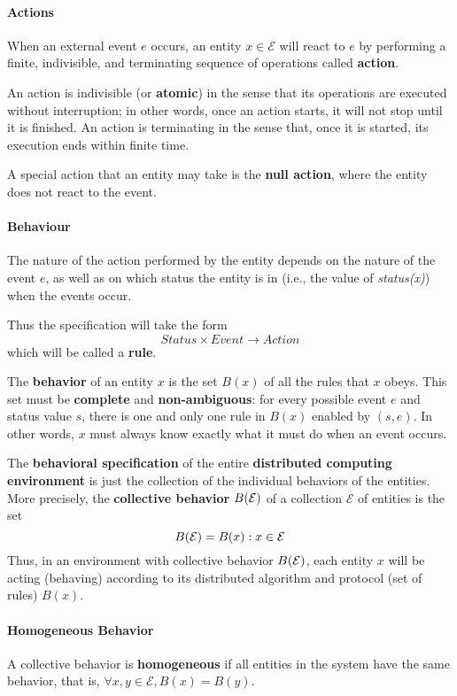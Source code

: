 \paragraph{Actions} When an external event $e$ occurs, an entity $x \in \mathcal{E}$ will react to $e$ by performing a finite, indivisible, and terminating sequence of operations called \textbf{action}.

An action is indivisible (or \textbf{atomic}) in the sense that its operations are executed without interruption; in other words, once an action starts, it will not stop until it is finished. An action is terminating in the sense that, once it is started, its execution ends within finite time. 

A special action that an entity may take is the \textbf{null action}, where the entity does not react to the event.

\paragraph{Behaviour} The nature of the action performed by the entity depends on the nature of the event $e$, as well as on which status the entity is in (i.e., the value of \textit{status(x)}) when the events occur. 

Thus the specification will take the form
$$ Status \times Event \xrightarrow{} Action$$
which will be called a \textbf{rule}.

The \textbf{behavior} of an entity $x$ is the set $B(x)$ of all the rules that $x$ obeys. This set must be \textbf{complete} and \textbf{non-ambiguous}: for every possible event $e$ and status value $s$, there is one and only one rule in $B(x)$ enabled by $(s,e)$. In other words, $x$ must always know exactly what it must do when an event occurs. 

The \textbf{behavioral specification} of the entire \textbf{distributed computing environment} is just the collection of the individual behaviors of the entities. More precisely, the \textbf{collective behavior} $B(\mathcal{E})$ of a collection $\mathcal{E}$ of entities is the set
$$B(\mathcal{E}) ={B(x): x \in \mathcal{E}}$$
Thus, in an environment with collective behavior $B(\mathcal{E})$, each entity $x$ will be acting (behaving) according to its distributed algorithm and protocol (set of rules) $B(x)$.

\paragraph{Homogeneous Behavior} A collective behavior is \textbf{homogeneous} if all entities in the system have the same behavior, that is, $\forall x, y \in \mathcal{E}, B(x) = B(y)$. 

